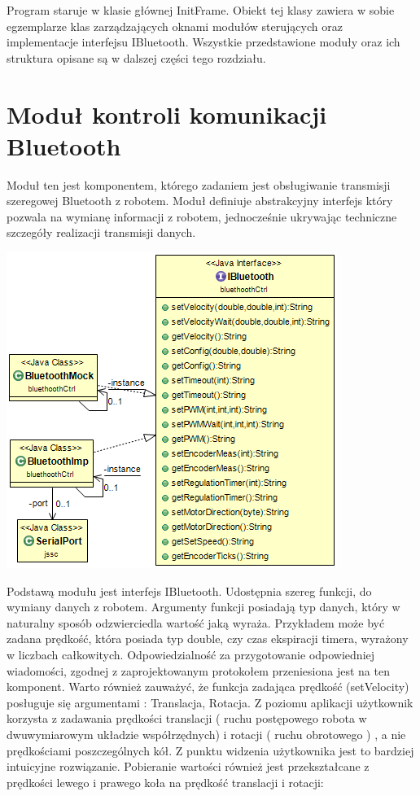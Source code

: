 \documentclass[eng,printmode]{mgr}
\begin{document}
Program staruje w klasie głównej InitFrame. Obiekt tej klasy zawiera w sobie egzemplarze klas zarządzających oknami modułów sterujących oraz implementacje interfejsu IBluetooth. Wszystkie przedstawione moduły oraz ich struktura opisane są w dalszej części tego rozdziału. 

 \section{Moduł kontroli komunikacji Bluetooth}

Moduł ten jest komponentem, którego zadaniem jest obsługiwanie transmisji szeregowej Bluetooth z robotem. Moduł definiuje abstrakcyjny interfejs który pozwala na wymianę informacji z robotem, jednocześnie ukrywając techniczne szczegóły realizacji transmisji danych. 

   \begin{center}
    \includegraphics[width=.6\textwidth]{images/bt}
   \end{center}

Podstawą modułu jest interfejs IBluetooth. Udostępnia szereg funkcji, do wymiany danych z robotem. Argumenty funkcji posiadają typ danych, który w naturalny sposób odzwierciedla wartość jaką wyraża. Przykładem może być zadana prędkość, która posiada typ double, czy czas ekspiracji timera, wyrażony w liczbach całkowitych. Odpowiedzialność za przygotowanie odpowiedniej wiadomości, zgodnej z zaprojektowanym protokołem przeniesiona jest na ten komponent. Warto również zauważyć, że funkcja zadająca prędkość (setVelocity) posługuje się argumentami : Translacja, Rotacja. Z poziomu aplikacji użytkownik korzysta z zadawania prędkości translacji ( ruchu postępowego robota w dwuwymiarowym układzie współrzędnych) i rotacji ( ruchu obrotowego ) , a nie prędkościami poszczególnych kół. Z punktu widzenia użytkownika jest to bardziej intuicyjne rozwiązanie. Pobieranie wartości również jest przekształcane z prędkości lewego i prawego koła na prędkość translacji i rotacji:
\end{document}
